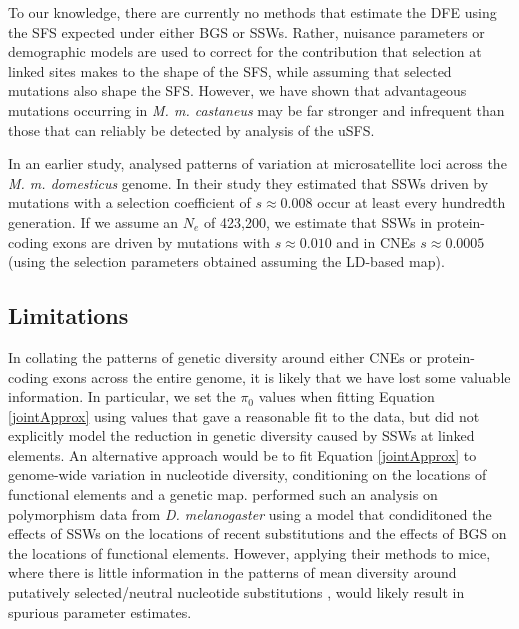 \documentclass[11pt]{article}
\begin{document}
	To our knowledge, there are currently no methods that estimate the DFE using the SFS expected under either BGS or SSWs. Rather, nuisance parameters or demographic models are used to correct for the contribution that selection at linked sites makes to the shape of the SFS, while assuming that selected mutations also shape the SFS. However, we have shown that advantageous mutations occurring in \textit{M. m. castaneus} may be far stronger and infrequent than those that can reliably be detected by analysis of the uSFS.

	In an earlier study, \cite{RN355} analysed patterns of variation at microsatellite loci across the \textit{M. m. domesticus} genome. In their study they estimated that SSWs driven by mutations with a selection coefficient of $s \approx 0.008$ occur at least every hundredth generation. If we assume an $N_e$ of 423,200, we estimate that SSWs in protein-coding exons are driven by mutations with $s \approx 0.010$ and in CNEs $s \approx 0.0005$ (using the selection parameters obtained assuming the LD-based map).


\subsection{Limitations}

	In collating the patterns of genetic diversity around either CNEs or protein-coding exons across the entire genome, it is likely that we have lost some valuable information. In particular, we set the $\pi_0$ values when fitting Equation \ref{jointApprox} using values that gave a reasonable fit to the data, but did not explicitly model the reduction in genetic diversity caused by SSWs at linked elements.	An alternative approach would be to fit Equation \ref{jointApprox} to genome-wide variation in nucleotide diversity, conditioning on the locations of functional elements and a genetic map. \cite{RN274} performed such an analysis on polymorphism data from \textit{D. melanogaster} using a model that condiditoned the effects of SSWs on the locations of recent substitutions and the effects of BGS on the locations of functional elements. However, applying their methods to mice, where there is little information in the patterns of mean diversity around putatively selected/neutral nucleotide substitutions \cite{RN122}, would likely result in spurious parameter estimates. 
	
\end{document}
